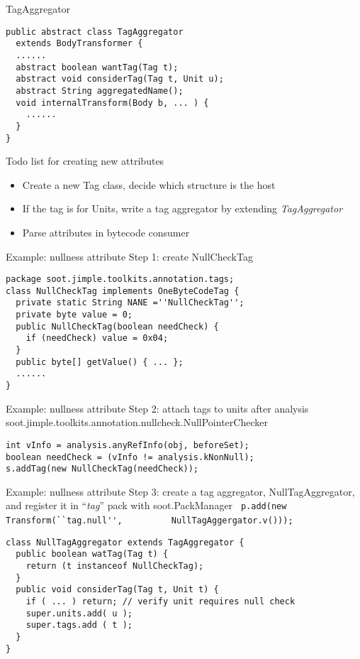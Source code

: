 \begin{slide}{TagAggregator}
{\small
\begin{verbatim}
public abstract class TagAggregator 
  extends BodyTransformer {
  ......
  abstract boolean wantTag(Tag t);
  abstract void considerTag(Tag t, Unit u);
  abstract String aggregatedName();
  void internalTransform(Body b, ... ) { 
    ...... 
  }
}
\end{verbatim}
}
\end{slide}

\begin{slide}{Todo list for creating new attributes}
\begin{itemize}
\item Create a new Tag class, decide which structure is the host
\item If the tag is for Units, write a tag aggregator by extending {\em TagAggregator}
\item Parse attributes in bytecode consumer
\end{itemize}
\end{slide}

\begin{slide}{Example: nullness attribute}
Step 1: create NullCheckTag
\footnotesize{
\begin{verbatim}
package soot.jimple.toolkits.annotation.tags;
class NullCheckTag implements OneByteCodeTag {
  private static String NANE =''NullCheckTag'';
  private byte value = 0;
  public NullCheckTag(boolean needCheck) {
    if (needCheck) value = 0x04;
  }
  public byte[] getValue() { ... };
  ......
}
\end{verbatim}
}
\end{slide}

\begin{slide}{Example: nullness attribute}
Step 2: attach tags to units after analysis \\
{\small soot.jimple.toolkits.annotation.nullcheck.NullPointerChecker}
\footnotesize{
\begin{verbatim}
int vInfo = analysis.anyRefInfo(obj, beforeSet);
boolean needCheck = (vInfo != analysis.kNonNull); 
s.addTag(new NullCheckTag(needCheck));
\end{verbatim}
}
\end{slide}

\begin{slide}{Example: nullness attribute}
Step 3: create a tag aggregator, NullTagAggregator, and
register it in ``{\em tag}'' pack with soot.PackManager
{\scriptsize \verb$ p.add(new Transform(``tag.null'',$
   \verb$         NullTagAggergator.v())); $}

\scriptsize{
\begin{verbatim}
class NullTagAggregator extends TagAggregator {
  public boolean watTag(Tag t) {
    return (t instanceof NullCheckTag);
  }
  public void considerTag(Tag t, Unit t) {
    if ( ... ) return; // verify unit requires null check
    super.units.add( u );
    super.tags.add ( t );
  }
}
\end{verbatim}
}
\end{slide}

